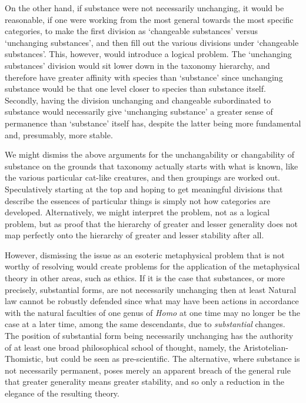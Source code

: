On the other hand, if substance were not necessarily unchanging, it would be reasonable, if one were working from the most general towards the most specific categories, to make the first division as `changeable substances' versus `unchanging substances', and then fill out the various divisions under `changeable substances'. This, however, would introduce a logical problem. The `unchanging substances' division would sit lower down in the taxonomy hierarchy, and therefore have greater affinity with species than `substance' since unchanging substance would be that one level closer to species than substance itself. Secondly, having the division unchanging and changeable subordinated to substance would necessarily give `unchanging substance' a greater sense of permanence than `substance' itself has, despite the latter being more fundamental and, presumably, more stable.

We might dismiss the above arguments for the unchangability or changability of substance on the grounds that taxonomy actually starts with what is known, like the various particular cat-like creatures, and then groupings are worked out. Speculatively starting at the top and hoping to get meaningful divisions that describe the essences of particular things is simply not how categories are developed. Alternatively, we might interpret the problem, not as a logical problem, but as proof that the hierarchy of greater and lesser generality does not map perfectly onto the hierarchy of greater and lesser stability after all.

However, dismissing the issue as an esoteric metaphysical problem that is not worthy of resolving would create problems for the application of the metaphysical theory in other areas, such as ethics. If it is the case that substances, or more precisely, substantial forms, are not necessarily unchanging then at least Natural law cannot be robustly defended since what may have been actions in accordance with the natural faculties of one genus of \emph{Homo} at one time may no longer be the case at a later time, among the same descendants, due to \emph{substantial} changes. The position of substantial form being necessarily unchanging has the authority of at least one broad philosophical school of thought, namely, the Aristotelian-Thomistic, but could be seen as pre-scientific. The alternative, where substance is not necessarily permanent, poses merely an apparent breach of the general rule that greater generality means greater stability, and so only a reduction in the elegance of the resulting theory.

